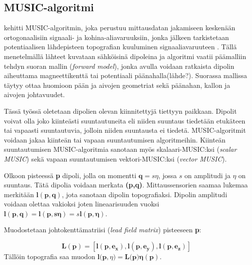 \subsection{MUSIC-algoritmi}
\cite{Schmidt1986MultipleEstimation} kehitti MUSIC-algoritmin, joka perustuu mittausdatan jakamiseen keskenään ortogonaalisiin signaali- ja kohina-aliavaruuksiin, jonka jälkeen tarkistetaan potentiaalisen lähdepisteen topografian kuuluminen signaaliavaruuteen \citep{Mosher1999SourceMUSIC}. Tällä menetelmällä lähteet kuvataan sähköisinä dipoleina ja algoritmi vaatii päämalliin tehdyn suoran mallin (\textit{forward model}), jonka avulla voidaan ratkaista dipolin aiheuttama magneettikenttä tai potentiaali päänahalla(lähde?). Suorassa mallissa täytyy ottaa huomioon pään ja aivojen geometriat sekä päänahan, kallon ja aivojen johtavuudet. \citep{hansen2010meg}



Tässä työssä oletetaan dipolien olevan kiinnitettyjä tiettyyn paikkaan. Dipolit voivat olla joko kiinteästi suuntautuneita eli niiden suuntaus tiedetään etukäteen tai vapaasti suuntautuvia, jolloin niiden suuntausta ei tiedetä. MUSIC-algoritmit voidaan jakaa kiinteän tai vapaan suuntautumisen algoritmeihin. Kiinteän suuntautumisen MUSIC-algoritmia sanotaan myös skalaari-MUSIC:ksi (\textit{scalar MUSIC}) sekä vapaan suuntautumisen vektori-MUSIC:ksi (\textit{vector MUSIC}). \citep{Makela2018TruncatedLocalization}

Olkoon pisteessä \textbf{p} dipoli, jolla on momentti $\mathbf{q} = s\eta$, jossa $s$ on amplitudi ja $\eta$ on suuntaus. Tätä dipolia voidaan merkata \textbf{(p,q)}. Mittaussensorien saamaa lukemaa merkitään $\mathbf{l(p,q)}$, jota sanotaan dipolin topografiaksi. Dipolin amplitudi voidaan olettaa vakioksi joten lineaarisuuden vuoksi $\mathbf{l(p,q)} = \mathbf{l(p,s\eta)} = s\mathbf{l(p,\eta)}$.

Muodostetaan johtokenttämatriisi (\textit{lead field matrix}) pisteeseen \textbf{p}:

\begin{equation}
    \mathbf{L(p) = [l(p,e_x),l(p,e_y),l(p,e_z)]}
\end{equation}
Tällöin topografia saa muodon $\mathbf{l(p},\eta)=\mathbf{L(p})\mathbf{\eta}(\mathbf{p})$.

